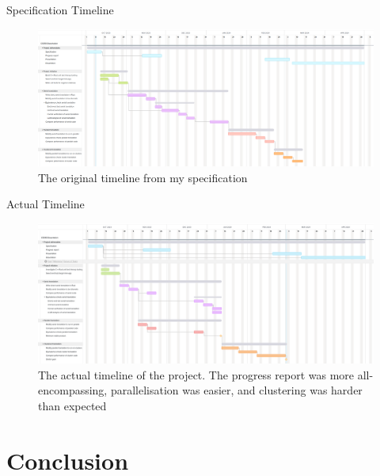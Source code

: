 \documentclass[10pt,aspectratio=169]{beamer}
\begin{document}
\begin{frame}{Specification Timeline}
    \begin{figure}[h]
        \centering
        \includegraphics[width=\textwidth]{images/specification_gantt_chart.png}
        \caption{The original timeline from my specification}
        \label{fig:specification_gantt_chart}
    \end{figure}
\end{frame}

\begin{frame}{Actual Timeline}
    \begin{figure}[h]
        \centering
        \includegraphics[width=\textwidth]{images/actual_gantt_chart.png}
        \caption{The actual timeline of the project. The progress report was more all-encompassing, parallelisation was easier, and clustering was harder than expected}
        \label{fig:actual_gantt_chart}
    \end{figure}
\end{frame}



\section{Conclusion}
\end{document}
